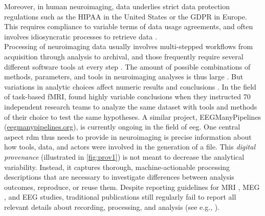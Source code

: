 Moreover, in human neuroimaging, data underlies strict data protection regulations such as the \gls{HIPAA} in the United States or the \gls{GDPR} in Europe.
This requires compliance to variable terms of data usage agreements, and often involves idiosyncratic processes to retrieve data \citep{waitedata}.\\
Processing of neuroimaging data usually involves multi-stepped workflows from acquisition through analysis to archival, and those frequently require several different software tools at every step \citep{poline2011}\citep{NISO2022119623}.
The amount of possible combinations of methods, parameters, and tools in neuroimaging analyses is thus large \citep{bowring2019exploring}.
But variations in analytic choices affect numeric results and conclusions \citep{silberzahn2018}.
In the field of task-based fMRI, \citet{botvinik2020variability} found highly variable conclusions when they instructed 70 independent research teams to analyze the same dataset with tools and methods of their choice to test the same hypotheses.
A similar project, EEGManyPipelines (\href{https://eegmanypipelines.org/}{eegmanypipelines.org}), is currently ongoing in the field of \gls{eeg}.
One central aspect \gls{rdm} thus needs to provide in neuroimaging is precise information about how tools, data, and actors were involved in the generation of a file.
This \textit{digital provenance}  (illustrated in \cref{fig:prov1}) is not meant to decrease the analytical variability.
Instead, it captures thorough, machine-actionable processing descriptions that are necessary to investigate differences between analysis outcomes, reproduce, or reuse them.
Despite reporting guidelines for MRI \citep{nichols2017best}, MEG \citep{pernet2020issues}, and EEG \citep{styles2021towards} studies, traditional publications still regularly fail to report all relevant details about recording, processing, and analysis (see e.g., \citet{vsovskic2022better}).

